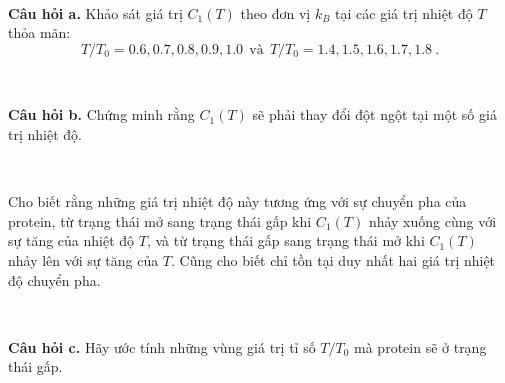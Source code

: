\ \ 

\textbf{Câu hỏi a.} Khảo sát giá trị $C_1(T)$ theo đơn vị $k_B$ tại các giá trị nhiệt độ $T$ thỏa mãn:
$$T/T_0=0.6,0.7,0.8,0.9,1.0 \ \  \text{và} \ \   T/T_0=1.4,1.5,1.6,1.7,1.8 \ . $$

\ \  

\textbf{Câu hỏi b.} Chứng minh rằng $C_1(T)$ sẽ phải thay đổi đột ngột tại một số giá trị nhiệt độ. 

\ \ 

Cho biết rằng những giá trị nhiệt độ này tương ứng với sự chuyển pha của protein, từ trạng thái mở sang trạng thái gấp khi $C_1(T)$ nhảy xuống cùng với sự tăng của nhiệt độ $T$, và từ trạng thái gấp sang trạng thái mở khi $C_1(T)$ nhảy lên với sự tăng của $T$. Cũng cho biết chỉ tồn tại duy nhất hai giá trị nhiệt độ chuyển pha.

\ \ 

\textbf{Câu hỏi c.} Hãy ước tính những vùng giá trị tỉ số $T/T_0$ mà protein sẽ ở trạng thái gấp.